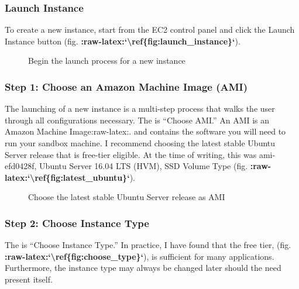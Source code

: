 \documentclass[letterpaper,10pt,english]{sphinxmanual}
\begin{document}
\subsubsection{Launch Instance}
\label{\detokenize{02-elastic-compute-cloud:Launch-Instance}}
To create a new instance, start from the EC2 control panel and click the
Launch Instance button (fig. {\color{red}\bfseries{}:raw-latex:{}`\textbackslash{}ref\{fig:launch\_instance\}{}`}).

\begin{figure}[htbp]
\centering
\capstart

\noindent{}
\caption{Begin the launch process for a new instance}\label{\detokenize{02-elastic-compute-cloud:id32}}\end{figure}


\subsubsection{Step 1: Choose an Amazon Machine Image (AMI)}
\label{\detokenize{02-elastic-compute-cloud:Step-1:-Choose-an-Amazon-Machine-Image-(AMI)}}
The launching of a new instance is a multi-step process that walks the
user through all configurations necessary. The  is “Choose
AMI.” An AMI is an Amazon Machine
Image:raw-latex:.
and contains the software you will need to run your sandbox machine. I
recommend choosing the latest stable Ubuntu Server release that is
free-tier eligible. At the time of writing, this was ami-efd0428f,
Ubuntu Server 16.04 LTS (HVM), SSD Volume Type (fig.
{\color{red}\bfseries{}:raw-latex:{}`\textbackslash{}ref\{fig:latest\_ubuntu\}{}`}).

\begin{figure}[htbp]
\centering
\capstart

\noindent{}
\caption{Choose the latest stable Ubuntu Server release as AMI}\label{\detokenize{02-elastic-compute-cloud:id33}}\end{figure}


\subsubsection{Step 2: Choose Instance Type}
\label{\detokenize{02-elastic-compute-cloud:Step-2:-Choose-Instance-Type}}
The  is “Choose Instance Type.” In practice, I have found
that the free tier,  (fig.
{\color{red}\bfseries{}:raw-latex:{}`\textbackslash{}ref\{fig:choose\_type\}{}`}), is sufficient for many
applications. Furthermore, the instance type may always be changed later
should the need present itself.
\end{document}
